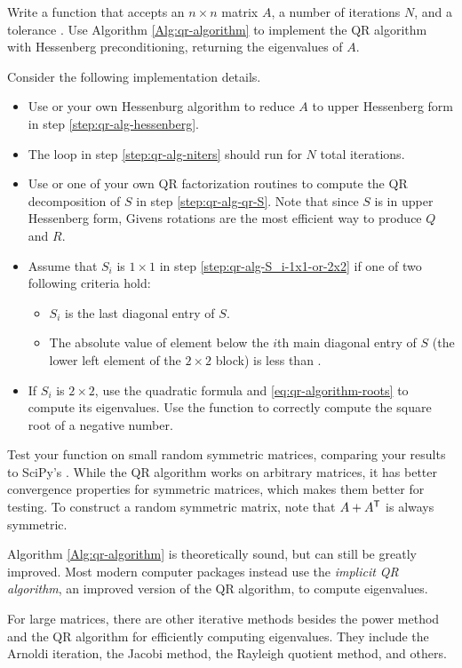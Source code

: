 \begin{problem}
Write a function that accepts an $n \times n$ matrix $A$, a number of iterations $N$, and a tolerance .
Use Algorithm \ref{Alg:qr-algorithm} to implement the QR algorithm with Hessenberg preconditioning, returning the eigenvalues of $A$.

Consider the following implementation details.
\begin{itemize}
    \item Use  or your own Hessenburg algorithm to reduce $A$ to upper Hessenberg form in step \ref{step:qr-alg-hessenberg}.
    \item The loop in step \ref{step:qr-alg-niters} should run for $N$ total iterations.
    \item Use  or one of your own QR factorization routines to compute the QR decomposition of $S$ in step \ref{step:qr-alg-qr-S}.
    Note that since $S$ is in upper Hessenberg form, Givens rotations are the most efficient way to produce $Q$ and $R$.
    \item Assume that $S_i$ is $1 \times 1$ in step \ref{step:qr-alg-S_i-1x1-or-2x2} if one of two following criteria hold:
    \begin{itemize}
        \item $S_i$ is the last diagonal entry of $S$.
        \item The absolute value of element below the $i$th main diagonal entry of $S$ (the lower left element of the $2\times 2$ block) is less than .
    \end{itemize}
    \item If $S_i$ is $2 \times 2$, use the quadratic formula and \eqref{eq:qr-algorithm-roots} to compute its eigenvalues.
    Use the function  to correctly compute the square root of a negative number.
\end{itemize}

Test your function on small random symmetric matrices, comparing your results to SciPy's .
While the QR algorithm works on arbitrary matrices, it has better convergence properties for symmetric matrices, which makes them better for testing.
To construct a random symmetric matrix, note that $A + A^{\mathsf T}$ is always symmetric.
\end{problem}

\begin{info}
Algorithm \ref{Alg:qr-algorithm} is theoretically sound, but can still be greatly improved.
Most modern computer packages instead use the \emph{implicit QR algorithm}, an improved version of the QR algorithm, to compute eigenvalues.

For large matrices, there are other iterative methods besides the power method and the QR algorithm for efficiently computing eigenvalues.
They include the Arnoldi iteration, the Jacobi method, the Rayleigh quotient method, and others.
\end{info}

